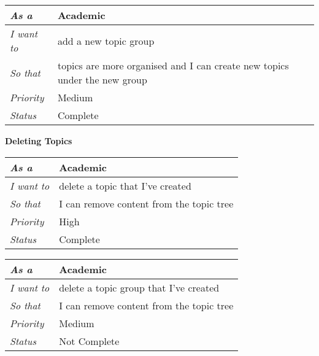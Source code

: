 \begin{table}[h!]
\begin{tabular}{|l|l|}
\hline
\textit{As a}      & Academic                                                                      \\ \hline
\textit{I want to} & add a new topic group                                                     \\ \hline
\textit{So that}   & topics are more organised and I can create new topics under the new group \\ \hline
\textit{Priority}  & {\color[HTML]{F8A102} Medium}                                             \\ \hline
\textit{Status}    & Complete                                                                  \\ \hline
\end{tabular}
\end{table}
\FloatBarrier
\textbf{Deleting Topics}
\FloatBarrier
\begin{table}[h!]
\begin{tabular}{|l|l|}
\hline
\textit{As a}      & Academic                                 \\ \hline
\textit{I want to} & delete a topic that I've created         \\ \hline
\textit{So that}   & I can remove content from the topic tree \\ \hline
\textit{Priority}  & {\color[HTML]{FE0000} High}              \\ \hline
\textit{Status}    & Complete                                 \\ \hline
\end{tabular}
\end{table}

\begin{table}[h!]
\begin{tabular}{|l|l|}
\hline
\textit{As a}      & Academic                                 \\ \hline
\textit{I want to} & delete a topic group that I've created   \\ \hline
\textit{So that}   & I can remove content from the topic tree \\ \hline
\textit{Priority}  & {\color[HTML]{F8A102} Medium}              \\ \hline
\textit{Status}    & Not Complete                                 \\ \hline
\end{tabular}
\end{table}

